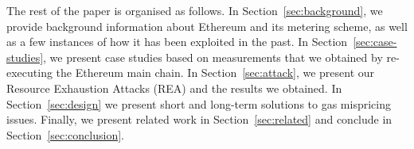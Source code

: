  The rest of the paper is organised as follows. In Section~\ref{sec:background}, we provide background information about Ethereum and its metering scheme, as well as a few instances of how it has been exploited in the past. In Section~\ref{sec:case-studies}, we present case studies based on measurements that we obtained by re-executing the Ethereum main chain. In Section~\ref{sec:attack}, we present our Resource Exhaustion Attacks (REA) and the results we obtained. In Section~\ref{sec:design} we present short and long-term solutions to gas mispricing issues. Finally, we present related work in Section~\ref{sec:related} and conclude in Section~\ref{sec:conclusion}.
